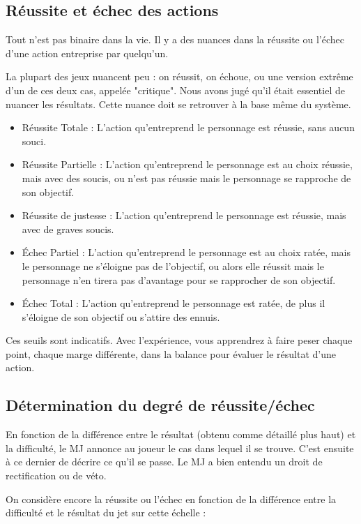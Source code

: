 \begin{multicols}{2}
\subsection{Réussite et échec des actions}

Tout n'est pas binaire dans la vie. Il y a des nuances dans la réussite ou l'échec d'une action entreprise par quelqu'un.

La plupart des jeux nuancent peu : on réussit, on échoue, ou une version extrême d'un de ces deux cas, appelée "critique". Nous avons jugé qu'il était essentiel de nuancer les résultats. Cette nuance doit se retrouver à la base même du système.

\begin{itemize}
\item Réussite Totale : L'action qu'entreprend le personnage est réussie, sans aucun souci.
\item Réussite Partielle : L'action qu'entreprend le personnage est au choix réussie, mais avec des soucis, ou n'est pas réussie mais le personnage se rapproche de son objectif.
\item Réussite de justesse : L'action qu'entreprend le personnage est réussie, mais avec de graves soucis.
\item Échec Partiel : L'action qu'entreprend le personnage est au choix ratée, mais le personnage ne s'éloigne pas de l'objectif, ou alors elle réussit mais le personnage n'en tirera pas d'avantage pour se rapprocher de son objectif.
\item Échec Total : L'action qu'entreprend le personnage est ratée, de plus il s'éloigne de son objectif ou s'attire des ennuis.
\end{itemize}

Ces seuils sont indicatifs. Avec l'expérience, vous apprendrez à faire peser chaque point, chaque marge différente, dans la balance pour évaluer le résultat d'une action.

\subsection{Détermination du degré de réussite/échec}

En fonction de la différence entre le résultat (obtenu comme détaillé plus haut) et la difficulté, le MJ annonce au joueur le cas dans lequel il se trouve. C'est ensuite à ce dernier de décrire ce qu'il se passe. Le MJ a bien entendu un droit de rectification ou de véto.

On considère encore la réussite ou l'échec en fonction de la différence entre la difficulté et le résultat du jet sur cette échelle :


\end{multicols}
